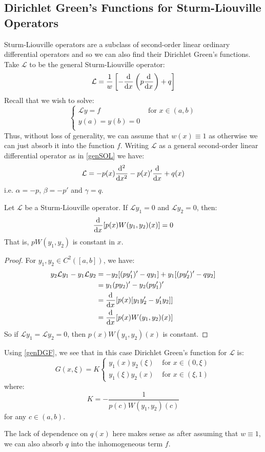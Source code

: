 \documentclass[../main.tex]{subfiles}
\begin{document}
\subsection{Dirichlet Green's Functions for Sturm-Liouville Operators}
Sturm-Liouville operators are a subclass of second-order linear ordinary differential operators and so we can also find their Dirichlet Green's functions.
Take $\mathcal{L}$ to be the general Sturm-Liouville operator:
\[
  \mathcal{L} = \frac{1}{w}\left[- \deriv{}{x}\left(p \deriv{}{x}\right) + q\right]
\]
Recall that we wish to solve:
\[
  \begin{cases}
  \mathcal{L}y = f & \text{ for } x \in (a, b) \\
  y(a) = y(b) = 0 &  \\
  \end{cases}
\]
Thus, without loss of generality, we can assume that $w(x) \equiv 1$ as otherwise we can just absorb it into the function $f$.
Writing $\mathcal{L}$ as a general second-order linear differential operator as in \cref{genSOL} we have:
\[
  \mathcal{L} = -p(x)\deriv[2]{}{x} - p(x)'\deriv{}{x} + q(x)
\]
i.e. $\alpha = -p$, $\beta = -p'$ and $\gamma = q$.
\begin{proposition}
  Let $\mathcal{L}$ be a Sturm-Liouville operator.
  If $\mathcal{L}y_1 = 0$ and $\mathcal{L}y_2 = 0$, then:
  \[
    \deriv{}{x}[p(x) W(y_1, y_2)(x)] = 0
  \]
  That is, $pW(y_1, y_2)$ is constant in $x$.
\end{proposition}
\begin{proof}
  For $y_1, y_2 \in C^2([a, b])$, we have:
  \begin{align*}
    y_2 \mathcal{L}y_1 - y_1 \mathcal{L}y_2 &= - y_2[(p y_1')' - qy_1] + y_1[(p y_2')' - qy_2] \\
                                            &= y_1(py_2)' - y_2(py_1')' \\
                                            &= \deriv{}{x}[p(x)[y_1 y_2' - y_1' y_2]] \\
                                            &= \deriv{}{x}[p(x)W(y_1, y_2)(x)]
  \end{align*}
  So if $\mathcal{L}y_1 = \mathcal{L}y_2 = 0$, then $p(x) W(y_1, y_2)(x)$ is constant.
\end{proof}
Using \cref{genDGF}, we see that in this case Dirichlet Green's function for $\mathcal{L}$ is:
\[
  G(x, \xi) = K \begin{cases}
    y_1(x)y_2(\xi) & \text{ for } x \in (0, \xi) \\
    y_1(\xi)y_2(x) & \text{ for } x \in (\xi, 1)
    \end{cases}
\]
where:
\[
  K = - \frac{1}{p(c) W(y_1, y_2)(c)}
\]
for any $c \in (a, b)$.
\begin{remark}
  The lack of dependence on $q(x)$ here makes sense as after assuming that $w \equiv 1$, we can also absorb $q$ into the inhomogeneous term $f$.
\end{remark}
\end{document}

